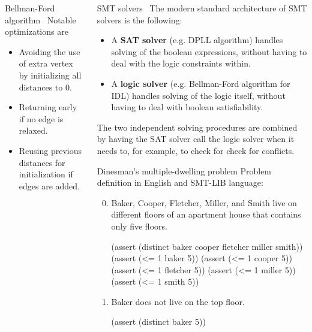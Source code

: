 \documentclass{beamer}
\begin{document}
\begin{frame}[fragile,t]
\begin{columns}[t,onlytextwidth]
\begin{column}{0.485\textwidth}
\begin{block}{Bellman-Ford algorithm~\cite{CLRS}}
			Notable optimizations are
			\begin{itemize}
				\item Avoiding the use of extra vertex by initializing all distances to 0.
				\item Returning early if no edge is relaxed.
				\item Reusing previous distances for initialization if edges are added.
			\end{itemize}
		\end{block}
	\end{column}

	\begin{column}{0.485\textwidth}
		\begin{block}{SMT solvers~\cite{slides}}
			The modern standard architecture of SMT solvers is the following:
			\begin{itemize}
				\item A \textbf{SAT solver} (e.g. DPLL algorithm) handles solving of the boolean expressions, without having to deal with the logic constraints within.
				\item A \textbf{logic solver} (e.g. Bellman-Ford algorithm for IDL) handles solving of the logic itself, without having to deal with boolean satisfiability.
			\end{itemize}
			The two independent solving procedures are combined by having the SAT solver call the logic solver when it needs to, for example, to check for check for conflicts.
		\end{block}
	
		\begin{block}{Dinesman's multiple-dwelling problem} %
			Problem definition in English and SMT-LIB language:
			\begin{enumerate}
				\setcounter{enumi}{-1} %
				
				\item Baker, Cooper, Fletcher, Miller, and Smith live on different floors of an apartment house that contains only five floors.
				\begin{smtlib}
					(assert (distinct baker cooper fletcher miller smith))
					(assert (<= 1 baker 5))
					(assert (<= 1 cooper 5))
					(assert (<= 1 fletcher 5))
					(assert (<= 1 miller 5))
					(assert (<= 1 smith 5))
				\end{smtlib}
				
				\item Baker does not live on the top floor.
				\begin{smtlib}
					(assert (distinct baker 5))
				\end{smtlib}
			

\end{enumerate}
\end{block}
\end{column}
\end{columns}
\end{frame}
\end{document}
